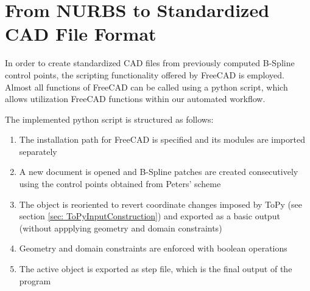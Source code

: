 \section{From NURBS to Standardized CAD File Format}
In order to create standardized CAD files from previously computed B-Spline control points, the scripting functionality offered by FreeCAD is employed. Almost all functions of FreeCAD can be called using a python script, which allows utilization FreeCAD functions within our automated workflow. \cite{FreeCAD}

The implemented python script is structured as follows: 
\begin{enumerate}
\item The installation path for FreeCAD is specified and its modules are imported separately
\item A new document is opened and B-Spline patches are created consecutively using the control points obtained from Peters' scheme
\item The object is reoriented to revert coordinate changes imposed by ToPy (see section \ref{sec: ToPyInputConstruction}) and exported as a basic output (without appplying geometry and domain constraints)
\item Geometry and domain constraints are enforced with boolean operations
\item The active object is exported as step file, which is the final output of the program
\end{enumerate} 

